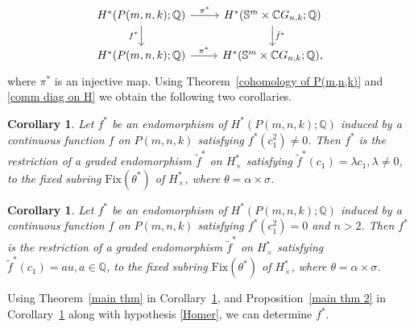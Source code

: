 \documentclass{amsart}
\newtheorem{corollary}[theorem]{Corollary}
\newcommand{\thmref}[1]{Theorem~\ref{#1}}
\newcommand{\propref}[1]{Proposition~\ref{#1}}
\newcommand{\corref}[1]{Corollary~\ref{#1}}
\begin{document}
	\begin{equation}\label{comm diag on H}
		\begin{tikzcd}
			{H^*(P(m,n,k);\mathbb Q)}  & {H^*(\mathbb S^m\times \mathbb CG_{n,k};\mathbb Q)} \\
			{H^*(P(m,n,k);\mathbb Q)} & {H^*(\mathbb S^m\times \mathbb CG_{n,k};\mathbb Q),}
			\arrow["{\pi^*}", from=1-1, to=1-2]
			\arrow["{f^*}"', from=1-1, to=2-1]
			\arrow["{\bar f^*}", from=1-2, to=2-2]
			\arrow["{\pi^*}", from=2-1, to=2-2]
		\end{tikzcd}
	\end{equation}
	where $\pi^*$ is an injective map. Using \thmref{cohomology of P(m,n,k)} and \eqref{comm diag on H} we obtain the following two corollaries. 
	\begin{corollary}\label{cor3}
		Let %
$f^*$ be an endomorphism of $H^*(P(m,n,k); \mathbb{Q})$ induced by a continuous function $f$ on $P(m,n,k)$ satisfying $f^*(c_1^2) \ne 0$. Then
		$f^*$ is the restriction of a graded endomorphism $\tilde{f}^*$ on  $H^*_\times$ satisfying $\tilde{f}^*(c_1) = \lambda c_1, \lambda \neq 0$,  to the fixed subring $\mathrm{Fix}(\theta^*)$ %
of $H^*_\times$, where %
$\theta = \alpha\times \sigma$.
	\end{corollary}
	\begin{corollary}\label{cor4}
		Let $f^*$ be an endomorphism of $H^*(P(m,n,k); \mathbb{Q})$ induced by a continuous function $f$ on $P(m,n,k)$ satisfying $f^*(c_1^2) =0$ and $n>2$. Then
		$f^*$ is the restriction of a graded endomorphism $\tilde{f}^*$ on  $H^*_\times$ satisfying $\tilde{f}^*(c_1) = au, a \in \mathbb{Q}$,  to the fixed subring $\mathrm{Fix}(\theta^*)$ %
of $H^*_\times$, where %
$\theta = \alpha\times \sigma$.
	\end{corollary}
	Using \thmref{main thm} in \corref{cor3}, and \propref{main thm 2} in \corref{cor4} along with hypothesis \eqref{Homer}, we can determine $f^*$.
	
\end{document}
